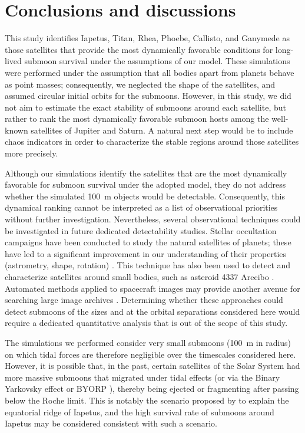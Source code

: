 \documentclass{aa}
\begin{document}
\section{Conclusions and discussions}
This study identifies Iapetus, Titan, Rhea, Phoebe, Callisto, and Ganymede as those satellites that provide the most dynamically favorable conditions for long-lived submoon survival under the assumptions of our model.
These simulations were performed under the assumption that all bodies apart from planets behave as point masses; consequently, we neglected the shape of the satellites, and assumed circular initial orbits for the submoons.
 However, in this study, we did not aim to estimate the exact stability of submoons around each satellite, but rather to rank the most dynamically favorable submoon hosts among the well-known satellites of Jupiter and Saturn.
A natural next step would be to include chaos indicators in order to characterize the stable regions around those satellites more precisely. 

Although our simulations identify the satellites that are the most dynamically favorable for submoon survival under the adopted model, they do not address whether the simulated 100~m objects would be detectable. Consequently, this dynamical ranking cannot be interpreted as a list of observational priorities without further investigation.
Nevertheless, several observational techniques could be investigated in future dedicated detectability studies.
Stellar occultation campaigns have been conducted to study the natural satellites of planets; these have led to a significant improvement in our understanding of their properties (astrometry, shape, rotation) \citep{gomes_2020}. This technique has also been used to detect and characterize satellites around small bodies, such as asteroid 4337 Arecibo \citep{Gault2022Arecibo, Liu_2025, Lallemand2026}. Automated methods applied to spacecraft images may provide another avenue for searching large image archives \citep{Quaglia_2025}. Determining whether these approaches could detect submoons of the sizes and at the orbital separations considered here would require a dedicated quantitative analysis that is out of the scope of this study.


The simulations we performed consider very small submoons (100~m in radius) on which tidal forces are therefore negligible over the timescales considered here. However, it is possible that, in the past, certain satellites of the Solar System had more massive submoons that migrated under tidal effects (or via the Binary Yarkovsky effect or BYORP \citep{Zhou_2024}), thereby being ejected or fragmenting after passing below the Roche limit. This is notably the scenario proposed by \cite{LEVISON2011773} to explain the equatorial ridge of Iapetus, and the high survival rate of submoons around Iapetus may be considered consistent with such a scenario.
\end{document}
